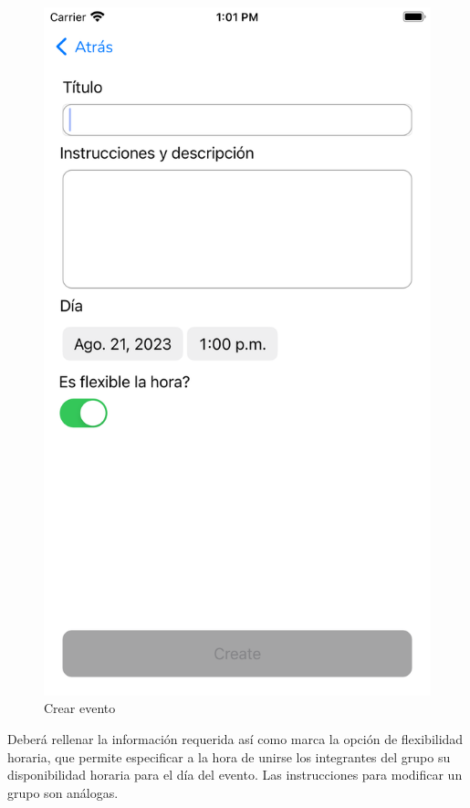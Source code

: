 \begin{appendices}
\begin{figure}[H]
\begin{minipage}{0.3\textwidth}
        \end{minipage}
        \begin{minipage}{0.3\textwidth}
            \centering
            \includegraphics[cframe=black 2pt,width=1\linewidth]{images/manual/crearEventoFormulario.png}
        \end{minipage}
        \caption{Crear evento}
        \label{fig:my_label}
\end{figure}
Deberá rellenar la información requerida así como marca la opción de flexibilidad horaria, que permite especificar a la hora de unirse los integrantes del grupo su disponibilidad horaria para el día del evento.
Las instrucciones para modificar un grupo son análogas.

\end{appendices}
